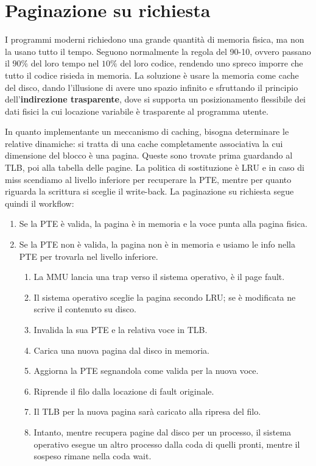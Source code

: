 \section{Paginazione su richiesta}
I programmi moderni richiedono una grande quantità di memoria fisica, ma non la usano tutto il tempo. Seguono normalmente la regola del 90-10, ovvero
passano il $90\%$ del loro tempo nel $10\%$ del loro codice, rendendo uno spreco imporre che tutto il codice risieda in memoria. La soluzione è usare
la memoria come cache del disco, dando l'illusione di avere uno spazio infinito e sfruttando il principio dell'\textbf{indirezione trasparente}, dove si
supporta un posizionamento flessibile dei dati fisici la cui locazione variabile è trasparente al programma utente.\par
In quanto implementante un meccanismo di caching, bisogna determinare le relative dinamiche: si tratta di una cache completamente associativa la cui
dimensione del blocco è una pagina. Queste sono trovate prima guardando al TLB, poi alla tabella delle pagine. La politica di sostituzione è LRU e in
caso di miss scendiamo al livello inferiore per recuperare la PTE, mentre per quanto riguarda la scrittura si sceglie il write-back. La paginazione su
richiesta segue quindi il workflow: \begin{enumerate}
    \item Se la PTE è valida, la pagina è in memoria e la voce punta alla pagina fisica.
    \item Se la PTE non è valida, la pagina non è in memoria e usiamo le info nella PTE per trovarla nel livello inferiore.
    \begin{enumerate}
        \item La MMU lancia una trap verso il sistema operativo, è il page fault.
        \item Il sistema operativo sceglie la pagina secondo LRU; se è modificata ne scrive il contenuto su disco.
        \item Invalida la sua PTE e la relativa voce in TLB.
        \item Carica una nuova pagina dal disco in memoria.
        \item Aggiorna la PTE segnandola come valida per la nuova voce.
        \item Riprende il filo dalla locazione di fault originale.
        \item Il TLB per la nuova pagina sarà caricato alla ripresa del filo.
        \item Intanto, mentre recupera pagine dal disco per un processo, il sistema operativo esegue un altro processo dalla coda di quelli pronti,
        mentre il sospeso rimane nella coda wait.
    \end{enumerate}
\end{enumerate}

